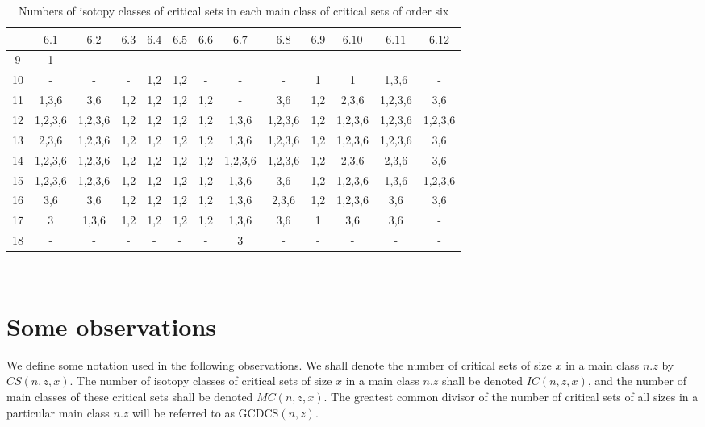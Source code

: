 \documentclass[12pt]{report}
\begin{document}
\begin{table}
\begin{center}
\setlength{\tabcolsep}{4.5pt}
\caption{Numbers of isotopy classes of critical sets in each main class of critical sets of order six \vspace{3mm}}
\label{six}
\begin{tabular}{|*{13}{c|}} \hline
& $6.1$ & $6.2$ & $6.3$ & $6.4$ & $6.5$ & $6.6$ & $6.7$ & $6.8$ & $6.9$ & $6.10$ & $6.11$ & $6.12$ \\
\hline
9 &  1 &   -   &    -   &  -   &  -   &   -   &    -   &  -   & -     &  -   &  -   &  - \\
10 &   -   &   -   &    -   & 1,2 & 1,2 &   -   &    -   &  -   & 1 & 1 & 1,3,6 &  - \\
11 & 1,3,6 & 3,6 & 1,2 & 1,2 & 1,2 & 1,2 &    -   & 3,6 & 1,2  & 2,3,6 & 1,2,3,6 & 3,6  \\
12 & 1,2,3,6 & 1,2,3,6 & 1,2 & 1,2 & 1,2 & 1,2 & 1,3,6 & 1,2,3,6 & 1,2 & 1,2,3,6 & 1,2,3,6 & 1,2,3,6 \\
13 & 2,3,6 & 1,2,3,6 & 1,2 & 1,2 & 1,2 & 1,2 & 1,3,6 & 1,2,3,6 & 1,2 & 1,2,3,6 & 1,2,3,6 & 3,6 \\
14 & 1,2,3,6 & 1,2,3,6 & 1,2 & 1,2 & 1,2 & 1,2 & 1,2,3,6 & 1,2,3,6 & 1,2 & 2,3,6 & 2,3,6 & 3,6 \\
15 & 1,2,3,6 & 1,2,3,6 & 1,2 & 1,2 & 1,2 & 1,2 & 1,3,6 & 3,6 & 1,2 & 1,2,3,6 & 1,3,6 & 1,2,3,6 \\
16 & 3,6 & 3,6 & 1,2 & 1,2 & 1,2 & 1,2 & 1,3,6 & 2,3,6 & 1,2 & 1,2,3,6 & 3,6 & 3,6 \\
17 & 3 & 1,3,6 & 1,2 & 1,2 & 1,2 & 1,2 & 1,3,6 & 3,6 & 1 & 3,6 & 3,6 &    - \\
18 &   -   &   -   &    -   &  -   &  -   &   -   & 3 &  -   &   -   &  -   &  -   &    -  \\
\hline
\end{tabular}\vspace {3mm} \\
\end{center}
\end{table}
 
\section{Some observations}
We define some notation used in the following observations. We
shall denote the number of critical sets of size $x$ in a main class
$n.z$ by $CS(n,z,x)$. 
The number of isotopy classes of critical sets
of size $x$ in a main class $n.z$ shall be denoted $IC(n,z,x)$, and
the number of main classes of these critical sets shall be denoted
$MC(n,z,x)$.  The greatest common divisor of the number of critical
sets of all sizes in a particular main class $n.z$ will be referred to
as GCDCS$(n,z)$.
\end{document}
